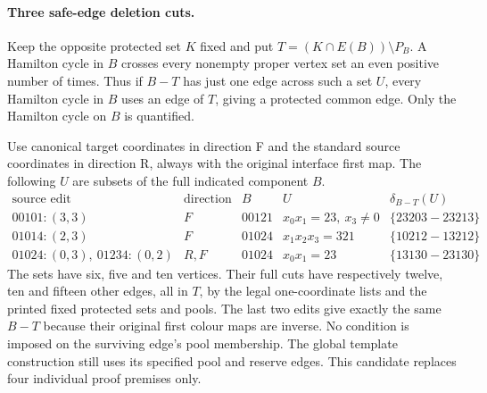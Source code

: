 \paragraph{Three safe-edge deletion cuts.}
Keep the opposite protected set $K$ fixed and put
$T=(K\cap E(B))\setminus P_B$. A Hamilton cycle in $B$ crosses
every nonempty proper vertex set an even positive number of times.
Thus if $B-T$ has just one edge across such a set $U$, every Hamilton
cycle in $B$ uses an edge of $T$, giving a protected common edge.
Only the Hamilton cycle on $B$ is quantified.

Use canonical target coordinates in direction F and the standard source
coordinates in direction R, always with the original interface first map.
The following $U$ are subsets of the full indicated component $B$.
\[
\begin{array}{c|c|c|c|c}
\text{source edit}&\text{direction}&B&U&\delta_{B-T}(U)\\\hline
00101:(3,3)&F&00121&x_0x_1=23,\ x_3\ne0&\{23203\!-23213\}\\
01014:(2,3)&F&01024&x_1x_2x_3=321&\{10212\!-13212\}\\
01024:(0,3),\ 01234:(0,2)&R,F&01024&x_0x_1=23&\{13130\!-23130\}
\end{array}
\]
The sets have six, five and ten vertices. Their full cuts have respectively
twelve, ten and fifteen other edges, all in $T$, by the legal one-coordinate
lists and the printed fixed protected sets and pools. The last two edits
give exactly the same $B-T$ because their original first colour maps are
inverse. No condition is imposed on the surviving edge's pool membership.
The global template construction still uses its specified pool and reserve
edges. This candidate replaces four individual proof premises only.
